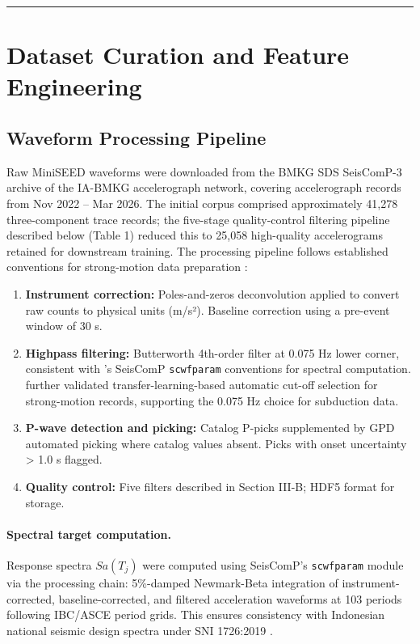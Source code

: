 \documentclass[10pt]{article}
\renewcommand{\cite}[1]{\citep{#1}}
\providecommand{\tightlist}{\setlength{\itemsep}{0pt}\setlength{\parskip}{0pt}}
\begin{document}
\begin{center}\rule{0.5\linewidth}{0.5pt}\end{center}

\section{Dataset Curation and Feature Engineering}

\subsection{Waveform Processing Pipeline}

Raw MiniSEED waveforms were downloaded from the BMKG SDS SeisComP-3 archive of the IA-BMKG accelerograph network, covering accelerograph records from Nov 2022 -- Mar 2026. The initial corpus comprised approximately 41{,}278 three-component trace records; the five-stage quality-control filtering pipeline described below (Table 1) reduced this to 25{,}058 high-quality accelerograms retained for downstream training. The processing pipeline follows established conventions for strong-motion data preparation \cite{ref67}:

\begin{enumerate}
\def\labelenumi{\arabic{enumi}.}
\tightlist
\item
 \textbf{Instrument correction:} Poles-and-zeros deconvolution applied to convert raw counts to physical units (m/s²). Baseline correction using a pre-event window of 30 s.
\item
 \textbf{Highpass filtering:} Butterworth 4th-order filter at 0.075 Hz lower corner, consistent with \citet{ref51}'s SeisComP \texttt{scwfparam} conventions for spectral computation. \citet{ref86} further validated transfer-learning-based automatic cut-off selection for strong-motion records, supporting the 0.075 Hz choice for subduction data.
\item
 \textbf{P-wave detection and picking:} Catalog P-picks supplemented by GPD automated picking \cite{ref42} where catalog values absent. Picks with onset uncertainty \textgreater{} 1.0 s flagged.
\item
 \textbf{Quality control:} Five filters described in Section III-B; \citet{ref52} HDF5 format for storage.
\end{enumerate}

\paragraph{Spectral target computation.} Response spectra \(Sa(T_j)\) were computed using SeisComP's \texttt{scwfparam} module via the \citet{ref51} processing chain: 5\%-damped Newmark-Beta integration of instrument-corrected, baseline-corrected, and filtered acceleration waveforms at 103 periods following IBC/ASCE period grids. This ensures consistency with Indonesian national seismic design spectra under SNI 1726:2019 \cite{ref12}.
\end{document}
